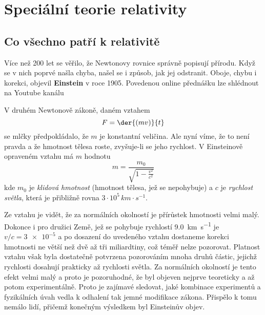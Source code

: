 \setchaptertoc
\chapter{Speciální teorie relativity}\label{fyz:IchapXV}
  \section{Co všechno patří k relativitě}\label{fyz:IchapXVsecI}
    Více než \num{200} let se věřilo, že Newtonovy rovnice správně popisují přírodu. Když se v nich
    poprvé našla chyba, našel se i způsob, jak jej odstranit. Oboje, chybu i korekci, objevil
    \textbf{Einstein} v roce \num{1905}. Povedenou online přednášku lze shlédnout na Youtube kanálu
    \cite{LLionTVESR}
    
    V druhém Newtonově zákoně, daném vztahem 
    \begin{equation*}
      F = \der{(mv)}{t}
    \end{equation*}
    se mlčky předpokládalo, že \(m\) je konstantní veličina. Ale nyní víme, že to není pravda a že 
    hmotnost tělesa roste, zvyšuje-li se jeho rychlost. V Einsteinově opraveném vztahu má \(m\) 
    hodnotu
    \begin{equation}\label{fyz:eq182}
      m = \frac{m_0}{\sqrt{1-\frac{v^2}{c^2}}}
    \end{equation}  
    kde \(m_0\) je \emph{klidová hmotnost} (hmotnost tělesa, jež se nepohybuje) a $c$ je 
    \emph{rychlost světla}, která je přibližně rovna $3\cdot10^5\, km\cdot s^{-1}$.
    
    Ze vztahu je vidět, že za normálních okolností je přírůstek hmotnosti velmi malý. Dokonce i pro 
    družici Země, jež se pohybuje rychlostí \SI{9.0}{\km\per\s} je \(v/c = \num{3e-5}\) a po 
    dosazení do uvedeného vztahu dostaneme korekci hmotnosti ne větší než dvě až tři miliardtiny, 
    což téměř nelze pozorovat. Platnost vztahu však byla dostatečně potvrzena pozorováním mnoha 
    druhů částic, jejichž rychlosti dosahují prakticky až rychlosti světla. Za normálních okolností 
    je tento efekt velmi malý a proto je pozoruhodné, že byl objeven nejprve teoreticky a až potom 
    experimentálně. Proto je zajímavé sledovat, jaké kombinace experimentů a fyzikálních úvah vedla 
    k odhalení tak jemné modifikace zákona. Přispělo k tomu nemálo lidí, přičemž konečným výsledkem 
    byl Einsteinův objev.
    

